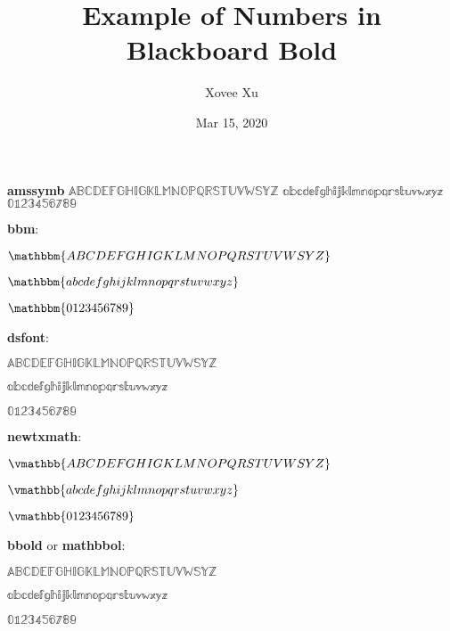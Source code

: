 \documentclass{article}
\title{Example of Numbers in Blackboard Bold}
\author{Xovee Xu}
\date{Mar 15, 2020}
\begin{document}
	
	\maketitle
	
	\textbf{amssymb}
	$\mathbb{ABCDEFGHIGKLMNOPQRSTUVWSYZ}$
	$\mathbb{abcdefghijklmnopqrstuvwxyz}$
	$\mathbb{0123456789}$
	
	\textbf{bbm}:
	
	$\mathbbm{ABCDEFGHIGKLMNOPQRSTUVWSYZ}$
	
	$\mathbbm{abcdefghijklmnopqrstuvwxyz}$
	
	$\mathbbm{0123456789}$
	
	\textbf{dsfont}:
	
	$\mathds{ABCDEFGHIGKLMNOPQRSTUVWSYZ}$
	
	$\mathds{abcdefghijklmnopqrstuvwxyz}$
	
	$\mathds{0123456789}$
	
	\textbf{newtxmath}:
	
	$\vmathbb{ABCDEFGHIGKLMNOPQRSTUVWSYZ}$
	
	$\vmathbb{abcdefghijklmnopqrstuvwxyz}$
	
	$\vmathbb{0123456789}$
	
	\textbf{bbold} or \textbf{mathbbol}:
	
	$\mathbb{ABCDEFGHIGKLMNOPQRSTUVWSYZ}$
	
	$\mathbb{abcdefghijklmnopqrstuvwxyz}$
	
	$\mathbb{0123456789}$
	
\end{document}
